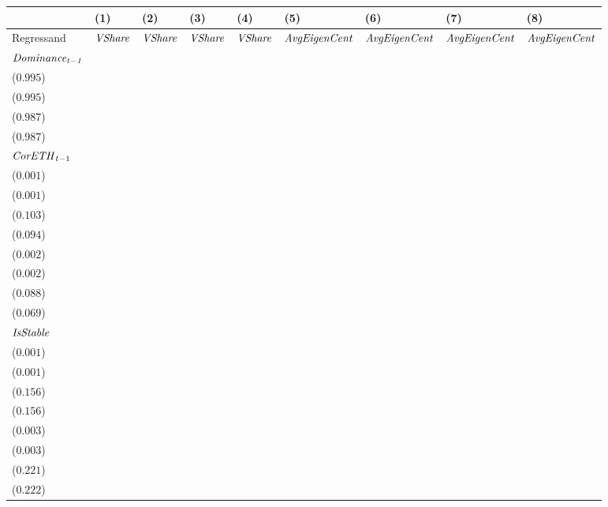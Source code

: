 \begin{tabular}{lllllllll}
\toprule
{} &                                    (1) &                                    (2) &                                    (3) &                                    (4) &                                    (5) &                                    (6) &                                    (7) &                                    (8) \\
\midrule
Regressand                   &                         ${\it VShare}$ &                         ${\it VShare}$ &                         ${\it VShare}$ &                         ${\it VShare}$ &                   ${\it AvgEigenCent}$ &                   ${\it AvgEigenCent}$ &                   ${\it AvgEigenCent}$ &                   ${\it AvgEigenCent}$ \\
$\it Dominance_{t-1}$        &  \makecell{$0.995^{***}$ \\ ($0.995$)} &  \makecell{$0.995^{***}$ \\ ($0.995$)} &                            \makecell{} &                            \makecell{} &  \makecell{$0.987^{***}$ \\ ($0.987$)} &  \makecell{$0.987^{***}$ \\ ($0.987$)} &                            \makecell{} &                            \makecell{} \\
${{\it CorETH}}_{t-1}$       &   \makecell{$0.000^{**}$ \\ ($0.001$)} &  \makecell{$0.000^{***}$ \\ ($0.001$)} &  \makecell{$0.036^{***}$ \\ ($0.103$)} &  \makecell{$0.033^{***}$ \\ ($0.094$)} &  \makecell{$0.001^{***}$ \\ ($0.002$)} &  \makecell{$0.001^{***}$ \\ ($0.002$)} &  \makecell{$0.058^{***}$ \\ ($0.088$)} &  \makecell{$0.045^{***}$ \\ ($0.069$)} \\
${\it IsStable}$             &  \makecell{$0.000^{***}$ \\ ($0.001$)} &  \makecell{$0.000^{***}$ \\ ($0.001$)} &  \makecell{$0.048^{***}$ \\ ($0.156$)} &  \makecell{$0.048^{***}$ \\ ($0.156$)} &  \makecell{$0.002^{***}$ \\ ($0.003$)} &  \makecell{$0.002^{***}$ \\ ($0.003$)} &  \makecell{$0.125^{***}$ \\ ($0.221$)} &  \makecell{$0.126^{***}$ \\ ($0.222$)} \\

\end{tabular}
